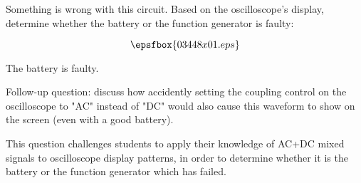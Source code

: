 

Something is wrong with this circuit.  Based on the oscilloscope's display, determine whether the battery or the function generator is faulty:

$$\epsfbox{03448x01.eps}$$







The battery is faulty.

\vskip 10pt

Follow-up question: discuss how accidently setting the coupling control on the oscilloscope to "AC" instead of "DC" would also cause this waveform to show on the screen (even with a good battery).







This question challenges students to apply their knowledge of AC+DC mixed signals to oscilloscope display patterns, in order to determine whether it is the battery or the function generator which has failed.




